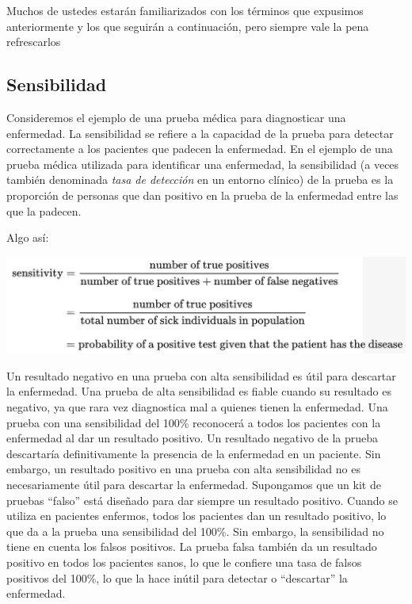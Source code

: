 \documentclass[
]{book}
\begin{document}
Muchos de ustedes estarán familiarizados con los términos que expusimos anteriormente y los que seguirán a continuación, pero siempre vale la pena refrescarlos

\hypertarget{sensibilidad}{%
\subsection{Sensibilidad}\label{sensibilidad}}

Consideremos el ejemplo de una prueba médica para diagnosticar una enfermedad. La sensibilidad se refiere a la capacidad de la prueba para detectar correctamente a los pacientes que padecen la enfermedad. En el ejemplo de una prueba médica utilizada para identificar una enfermedad, la sensibilidad (a veces también denominada \emph{tasa de detección} en un entorno clínico) de la prueba es la proporción de personas que dan positivo en la prueba de la enfermedad entre las que la padecen.

Algo así:

\includegraphics[width=15.35in]{img/sens}

Un resultado negativo en una prueba con alta sensibilidad es útil para descartar la enfermedad. Una prueba de alta sensibilidad es fiable cuando su resultado es negativo, ya que rara vez diagnostica mal a quienes tienen la enfermedad. Una prueba con una sensibilidad del 100\% reconocerá a todos los pacientes con la enfermedad al dar un resultado positivo. Un resultado negativo de la prueba descartaría definitivamente la presencia de la enfermedad en un paciente. Sin embargo, un resultado positivo en una prueba con alta sensibilidad no es necesariamente útil para descartar la enfermedad. Supongamos que un kit de pruebas ``falso'' está diseñado para dar siempre un resultado positivo. Cuando se utiliza en pacientes enfermos, todos los pacientes dan un resultado positivo, lo que da a la prueba una sensibilidad del 100\%. Sin embargo, la sensibilidad no tiene en cuenta los falsos positivos. La prueba falsa también da un resultado positivo en todos los pacientes sanos, lo que le confiere una tasa de falsos positivos del 100\%, lo que la hace inútil para detectar o ``descartar'' la enfermedad.
\end{document}
